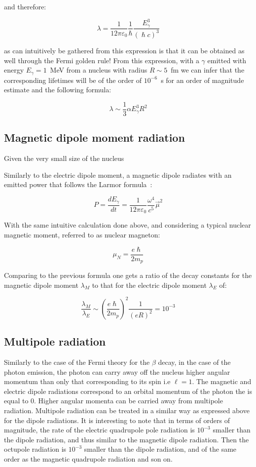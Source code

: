 \noindent and therefore:

$$ \lambda = \dfrac{1}{12 \pi \varepsilon_0} \dfrac{1}{\hslash}\dfrac{E_{\gamma}^3}{(\hslash c)^3}  $$

\noindent as can intuitively be gathered from this expression is that it can be obtained as well through the Fermi golden rule! From this expression, with a $\gamma$ emitted with energy $E_{\gamma} = 1$~MeV from a nucleus with radius $R \sim 5$~fm we can infer that the corresponding lifetimes will be of the order of $10^{-6}$~s for an order of magnitude estimate and the following formula:

$$ \lambda \sim \dfrac{1}{3} \alpha E_{\gamma}^3 R^2 $$

\subsection{Magnetic dipole moment radiation}

Given the very small size of the nucleus 

Similarly to the electric dipole moment, a magnetic dipole radiates with an emitted power that follows the Larmor formula~\cite{jackson2}:

$$ P =\dfrac{dE_{\gamma}}{dt} = \dfrac{1}{12 \pi \varepsilon_0} \dfrac{\omega^4}{c^5} \vec{\mu}^2 $$

With the same intuitive calculation done above, and considering a typical nuclear magnetic moment, referred to as nuclear magneton: 

$$ \mu_N = \dfrac{e \hslash}{2 m_p} $$

Comparing to the previous formula one gets a ratio of the decay constants for the magnetic dipole moment $\lambda_M$ to that for the electric dipole moment $\lambda_E$ of:

$$ \frac{\lambda_M}{\lambda_E} \sim \left ( \dfrac{e\hslash}{2m_p} \right )^2 \dfrac{1}{(eR)^2} = 10^{-3}$$

\subsection{Multipole radiation}

Similarly to the case of the Fermi theory for the $\beta$ decay, in the case of the photon emission, the photon can carry away off the nucleus higher angular momentum than only that corresponding to its spin i.e $\ell =1$. The magnetic and electric dipole radiations correspond to an orbital momentum of the photon the is equal to 0. Higher angular momenta can be carried away from multipole radiation. Multipole radiation can be treated in a similar way as expressed above for the dipole radiations. It is interesting to note that in terms of orders of magnitude, the rate of the electric quadrupole pole radiation is $10^{-3}$ smaller than the dipole radiation, and thus similar to the magnetic dipole radiation. Then the octupole radiation is $10^{-3}$ smaller than the dipole radiation, and of the same order as the magnetic quadrupole radiation and son on.

